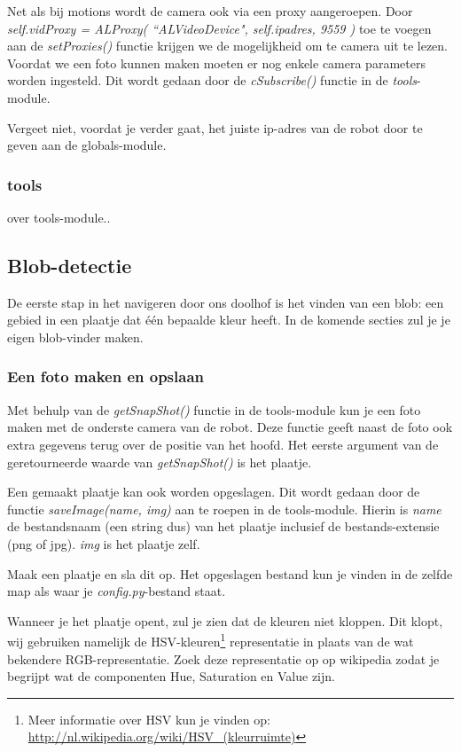 \documentclass[a4paper, twoside]{article}
\begin{document}
Net als bij motions wordt de camera ook via een proxy aangeroepen. Door \textit{self.vidProxy = ALProxy( ``ALVideoDevice", self.ipadres, 9559 )} toe te voegen aan de \textit{setProxies()} functie krijgen we de mogelijkheid om te camera uit te lezen. Voordat we een foto kunnen maken moeten er nog enkele camera parameters worden ingesteld. Dit wordt gedaan door de \textit{cSubscribe()} functie in de \textit{tools}-module.

Vergeet niet, voordat je verder gaat, het juiste ip-adres van de robot door te geven aan de globals-module.

\subsubsection{tools}
over tools-module..

\subsection{Blob-detectie}
De eerste stap in het navigeren door ons doolhof is het vinden van een blob: een gebied in een plaatje dat \'e\'en bepaalde kleur heeft. In de komende secties zul je je eigen blob-vinder maken.

\subsubsection{Een foto maken en opslaan}
Met behulp van de \textit{getSnapShot()} functie in de tools-module kun je een foto maken met de onderste camera van de robot. Deze functie geeft naast de foto ook extra gegevens terug over de positie van het hoofd. Het eerste argument van de geretourneerde waarde van \textit{getSnapShot()} is het plaatje.

Een gemaakt plaatje kan ook worden opgeslagen. Dit wordt gedaan door de functie \textit{saveImage(name, img)} aan te roepen in de tools-module. Hierin is \textit{name} de bestandsnaam (een string dus) van het plaatje inclusief de bestands-extensie (png of jpg). \textit{img} is het plaatje zelf.

Maak een plaatje en sla dit op. Het opgeslagen bestand kun je vinden in de zelfde map als waar je \textit{config.py}-bestand staat.

Wanneer je het plaatje opent, zul je zien dat de kleuren niet kloppen. Dit klopt, wij gebruiken namelijk de HSV-kleuren\footnote{Meer informatie over HSV kun je vinden op: \\ \url{http://nl.wikipedia.org/wiki/HSV_(kleurruimte)} } representatie in plaats van de wat bekendere RGB-representatie. Zoek deze representatie op op wikipedia zodat je begrijpt wat de componenten Hue, Saturation en Value zijn.
\end{document}
